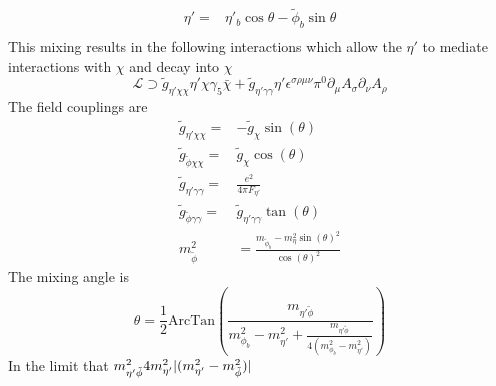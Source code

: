 \begin{equation}
    \begin{split}
        \eta' =& \eta'_b \cos\theta-\tilde{\phi}_{b} \sin\theta\\ 
    \end{split}
\end{equation}
This mixing results in the following interactions which allow the $\eta'$ to mediate interactions with $\chi$ and decay into $\chi$
\begin{equation}
\mathcal{L}\supset\tilde{g}_{\eta'\chi\chi}\eta'\chi\gamma_5\bar{\chi}+\tilde{g}_{\eta'\gamma\gamma}\eta'\epsilon^{\sigma\rho\mu\nu}\pi^0\partial_{\mu}A_{\sigma}\partial_{\nu}A_{\rho}
\end{equation}
The field couplings are
\begin{equation}
    \begin{split}
        \tilde{g}_{\eta'\chi\chi }=&-\tilde{g}_{\chi}\sin(\theta)\\
        \tilde{g}_{\tilde{\phi}\chi\chi }=&\tilde{g}_{\chi}\cos(\theta)\\
        \tilde{g}_{\eta'\gamma \gamma}= &\frac{e^2}{4\pi F_{\eta'}}\\
        \tilde{g}_{\tilde{\phi}\gamma \gamma}= &\tilde{g}_{\eta'\gamma \gamma}\tan(\theta)\\
        m_{\tilde{\phi}}^2&=\frac{m_{\tilde{\phi}_b}-m_{\eta}^2\sin(\theta)^2}{\cos(\theta)^2}
    \end{split}
\end{equation}
The mixing angle is
\begin{equation}
    \theta=\frac{1}{2}\text{ArcTan}\left(\frac{m_{\eta'\tilde{\phi}}}{m_{\phi_b}^2-m_{\eta'}^2+\frac{m_{\eta'\tilde{\phi}}}{4(m_{\phi_b}^2-m_{\eta'}^2)}}\right)
\end{equation}
In the limit that $m_{\eta'\tilde{\phi}}^2 \\ 4m_{\eta'}^2|(m_{\eta'}^2-m_{\tilde{\phi}}^2)|$
